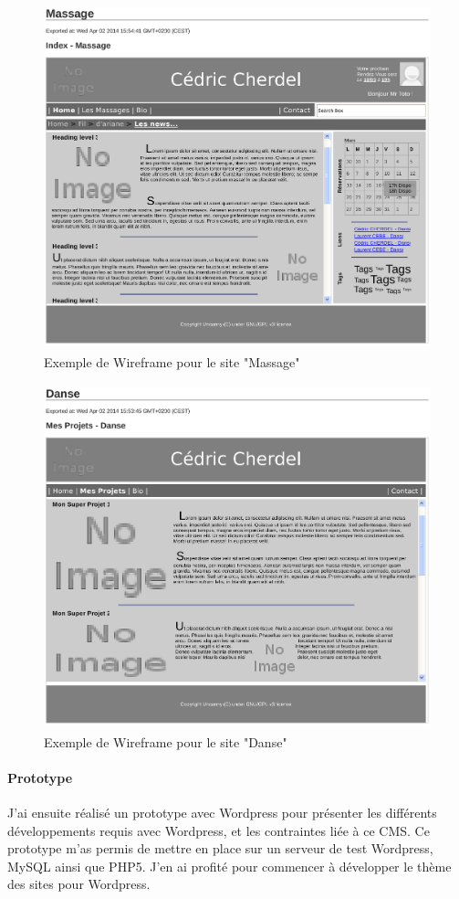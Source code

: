 \documentclass[11pt,a4paper,twoside]{report}
\begin{document}
				\begin{figure}[H]
					\centering
					\includegraphics[height=10cm]{Wireframe-Massage_1.eps}
					\caption{Exemple de Wireframe pour le site "Massage"}
					\label{fig:Wireframe Massage}
				\end{figure}
				\begin{figure}[H]
					\centering
					\includegraphics[height=10cm]{Wireframe-Danse_1.eps}
					\caption{Exemple de Wireframe pour le site "Danse"}
					\label{fig:Wireframe Danse}
				\end{figure}

			\paragraph*{Prototype}J'ai ensuite réalisé un prototype avec Wordpress pour présenter les différents développements requis avec Wordpress, et les contraintes liée à ce CMS. Ce prototype m'as permis de mettre en place sur un serveur de test Wordpress, MySQL ainsi que PHP5. J'en ai profité pour commencer à développer le thème des sites pour Wordpress.
\end{document}
